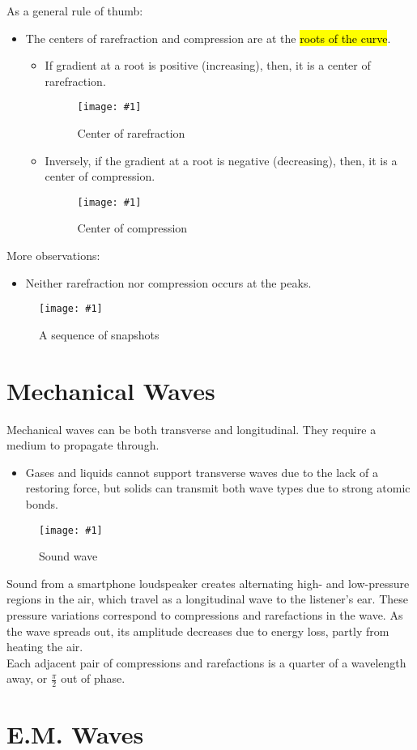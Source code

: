 \documentclass[a4paper,12pt]{article}
\let\oldsection\section
\renewcommand\section{\clearpage\oldsection}
\newcommand{\lb}{\\[8pt]}
\newcommand{\img}[4]{\begin{center}
  \begin{figure}[H]
    \centering
    \texttt{[image: \#1]}
    \caption{#3}
    \label{fig:#4}
  \end{figure}
\end{center}}
\begin{document}
As a general rule of thumb:
\begin{itemize}
  \item The centers of rarefraction and compression are at the \hl{roots of the curve}.
        \begin{itemize}
          \item If gradient at a root is positive (increasing), then, it is a center of rarefraction.
                \img{rarefraction.png}{0.4}{Center of rarefraction}{rarefraction}
          \item Inversely, if the gradient at a root is negative (decreasing), then, it is a center of compression.
                \img{compression.png}{0.4}{Center of compression}{compression}
        \end{itemize}
\end{itemize}
More observations:
\begin{itemize}
  \item Neither rarefraction nor compression occurs at the peaks.
\end{itemize}
\pagebreak

\img{4.png}{0.7}{A sequence of snapshots}{4}

\section{Mechanical Waves}

Mechanical waves can be both transverse and longitudinal. They require a medium to propagate through.
\begin{itemize}
  \item Gases and liquids cannot support transverse waves due to the lack of a restoring force, but solids can transmit both wave types due to strong atomic bonds.
\end{itemize}
\img{sound.png}{0.6}{Sound wave}{sound}
Sound from a smartphone loudspeaker creates alternating high- and low-pressure regions in the air, which travel as a longitudinal wave to the listener's ear. These pressure variations correspond to compressions and rarefactions in the wave. As the wave spreads out, its amplitude decreases due to energy loss, partly from heating the air.\lb
Each adjacent pair of compressions and rarefactions is a quarter of a wavelength away, or $\frac{\pi}{2}$ out of phase.

\section{E.M. Waves}
\end{document}
